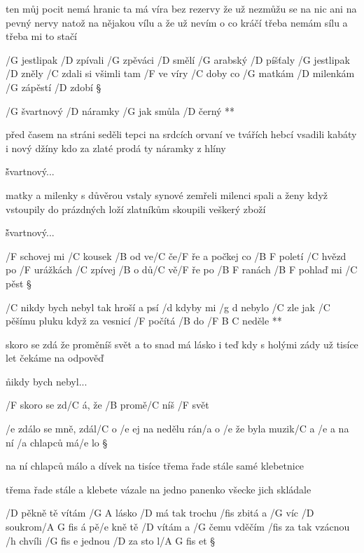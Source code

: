 ten můj pocit nemá hranic ta má víra bez rezervy
že už nezmůžu se na nic ani na pevný nervy
natož na nějakou vílu a že už nevím o co  kráčí
třeba nemám sílu a třeba mi to stačí




/G jestlipak /D zpívali /G zpěváci /D smělí
/G arabský /D píšťaly /G jestlipak /D zněly
/C zdali si všimli tam /F ve víry /C doby
co /G matkám /D milenkám /G zápěstí /D zdobí \S

\R /G švartnový /D náramky /G jak smůla /D černý **

před časem na stráni seděli tepci
na srdcích orvaní ve tvářích hebcí
vsadili kabáty i nový džíny
kdo za zlaté prodá ty náramky z hlíny \songgg

\r švartnový...

matky a milenky s důvěrou vstaly
synové zemřeli milenci spali
a ženy když vstoupily do prázdných loží
zlatníkům skoupili veškerý zboží \s

\r švartnový...




/F schovej mi /C kousek /B od ve/C če/F ře
a počkej co /{B F} poletí /C hvězd
po /F urážkách /C zpívej /B o dů/C vě/F ře
po /{B F} ranách /{B F} pohlaď mi /C pěst \S

\R /C nikdy bych nebyl tak hroší a psí
   /d kdyby mi /{g d} nebylo /C zle
   jak /C pěšímu pluku když za vesnicí
   /F počítá /B do /{F B C} neděle **

skoro se zdá že proměníš svět
a to snad má lásko i teď
kdy s holými zády už tisíce let
čekáme na odpověď \s

\r nikdy bych nebyl...

/F skoro se zd/C á, že /B promě/C níš /F svět




/e zdálo se mně, zdál/C o
/e ej na nedělu rán/a o
/e že byla muzik/C a
/e a na ní /a chlapců má/e lo \S

na ní chlapců málo
a dívek na tisíce
třema řade stále
samé klebetnice \s

třema řade stále
a klebete vázale
na jedno panenko
všecke jich skládale




/D pěkně tě vítám /{G A} lásko /D má
tak trochu /fis zbitá a /G víc /D soukrom/{A G fis} á
pě/e kně tě /D vítám a /G čemu vděčím /fis za tak vzácnou /h chvíli
/{G fis e } jednou /D za sto l/{A G fis} et \S

